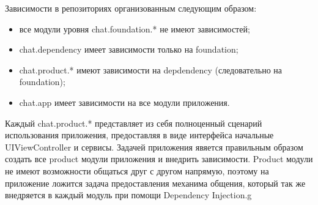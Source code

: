 Зависимости в репозиториях организованным следующим образом: 

\begin{itemize}
\item все модули уровня chat.foundation.* не имеют зависимостей;
\item chat.dependency имеет зависимости только на foundation;
\item chat.product.* имеют зависимости на depdendency (следовательно на foundation);
\item chat.app имеет зависимости на все модули приложения.
\end{itemize}

Каждый chat.product.* представляет из себя полноценный сценарий использования приложения, предоставляя в виде интерфейса начальные UIViewController и сервисы. Задачей приложения явяется правильным образом создать все product модули приложения и внедрить зависимости. Product модули не имеют возможности общаться друг с другом напрямую, поэтому на приложение ложится задача предоставления механима общения, который так же внедряется в каждый модуль при помощи Dependency Injection.g